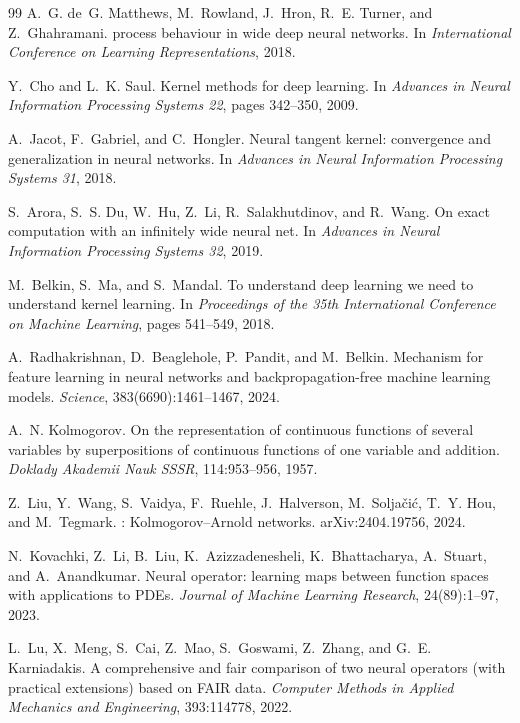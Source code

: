 \begin{thebibliography}{99}
A.~G. de~G. Matthews, M.~Rowland, J.~Hron, R.~E. Turner, and Z.~Ghahramani.
 process behaviour in wide deep neural networks.
\newblock In \emph{International Conference on Learning Representations}, 2018.

Y.~Cho and L.~K. Saul.
\newblock Kernel methods for deep learning.
\newblock In \emph{Advances in Neural Information Processing Systems 22}, pages 342--350, 2009.

A.~Jacot, F.~Gabriel, and C.~Hongler.
\newblock Neural tangent kernel: convergence and generalization in neural networks.
\newblock In \emph{Advances in Neural Information Processing Systems 31}, 2018.

S.~Arora, S.~S. Du, W.~Hu, Z.~Li, R.~Salakhutdinov, and R.~Wang.
\newblock On exact computation with an infinitely wide neural net.
\newblock In \emph{Advances in Neural Information Processing Systems 32}, 2019.

M.~Belkin, S.~Ma, and S.~Mandal.
\newblock To understand deep learning we need to understand kernel learning.
\newblock In \emph{Proceedings of the 35th International Conference on Machine Learning},
pages 541--549, 2018.

A.~Radhakrishnan, D.~Beaglehole, P.~Pandit, and M.~Belkin.
\newblock Mechanism for feature learning in neural networks and backpropagation-free machine
learning models.
\newblock \emph{Science}, 383(6690):1461--1467, 2024.

A.~N. Kolmogorov.
\newblock On the representation of continuous functions of several variables by superpositions
of continuous functions of one variable and addition.
\newblock \emph{Doklady Akademii Nauk SSSR}, 114:953--956, 1957.

Z.~Liu, Y.~Wang, S.~Vaidya, F.~Ruehle, J.~Halverson, M.~Solja\v{c}i\'c, T.~Y. Hou, and
M.~Tegmark.
: {Kolmogorov--Arnold} networks.
\newblock arXiv:2404.19756, 2024.

N.~Kovachki, Z.~Li, B.~Liu, K.~Azizzadenesheli, K.~Bhattacharya, A.~Stuart, and
A.~Anandkumar.
\newblock Neural operator: learning maps between function spaces with applications to {PDEs}.
\newblock \emph{Journal of Machine Learning Research}, 24(89):1--97, 2023.

L.~Lu, X.~Meng, S.~Cai, Z.~Mao, S.~Goswami, Z.~Zhang, and G.~E. Karniadakis.
\newblock A comprehensive and fair comparison of two neural operators (with practical
extensions) based on {FAIR} data.
\newblock \emph{Computer Methods in Applied Mechanics and Engineering}, 393:114778, 2022.


\end{thebibliography}
